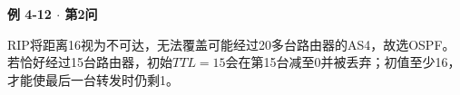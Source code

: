 {\color{ink}\bfseries 例 4-12 \(\cdot \) 第2问}\par\vspace{1bp}RIP将距离16视为不可达，无法覆盖可能经过20多台路由器的AS4，故选OSPF。若恰好经过15台路由器，初始\(TTL=\allowbreak{}15\)会在第15台减至0并被丢弃；初值至少16，才能使最后一台转发时仍剩1。
